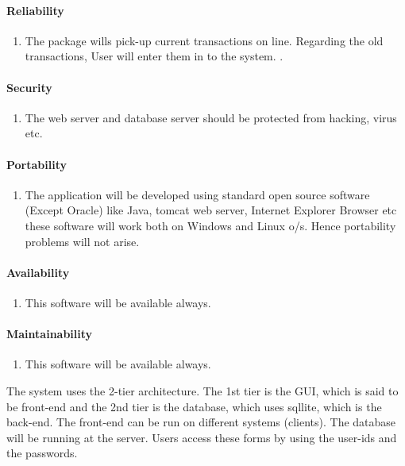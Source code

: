 \paragraph{Reliability }
\begin{enumerate}
\item The package wills pick-up current transactions on line. Regarding the old transactions, User will enter them in to the system. .\\
\end{enumerate}

\paragraph{Security }
\begin{enumerate}
\item The web server and database server should be protected from hacking, virus etc.\\
\end{enumerate}


\paragraph{Portability }
\begin{enumerate}
\item The application will be developed using standard open source software (Except Oracle) like Java, tomcat web server, Internet Explorer Browser etc these software will work both on Windows and Linux o/s.  Hence portability problems will not arise.\\
\end{enumerate}

\paragraph{Availability }
\begin{enumerate}
\item This software will be available always.\\
\end{enumerate}

\paragraph{Maintainability  }
\begin{enumerate}
 \item This software will be available always.\\
\end{enumerate}
The system uses the 2-tier architecture. The 1st tier is the GUI, which is said to be front-end and the 2nd tier is the database, which uses sqllite, which is the back-end.   
The front-end can be run on different systems (clients). The database will be running at the server. Users access these forms by using the user-ids and the passwords.\\

